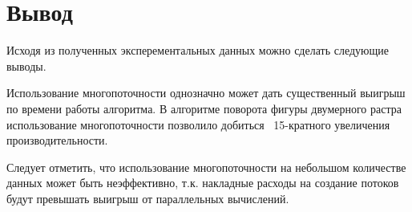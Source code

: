\captionsetup{singlelinecheck = false, justification=centering}


\section{Вывод}

Исходя из полученных эксперементальных данных можно сделать следующие выводы.

Использование многопоточности однозначно может дать существенный выигрыш по времени работы алгоритма. В алгоритме поворота фигуры двумерного растра использование многопоточности позволило добиться ~15-кратного увеличения производительности.

Следует отметить, что использование многопоточности на небольшом количестве данных может быть неэффективно, т.к. накладные расходы на создание потоков будут превышать выигрыш от параллельных вычислений.


